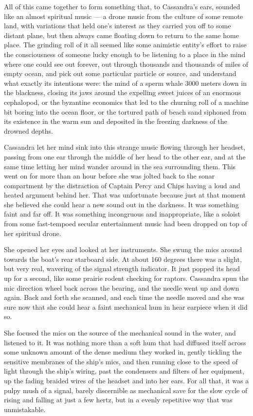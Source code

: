 \documentclass[]{scrbook}
\begin{document}
All of this came together to form something that, to Cassandra's ears,
sounded like an almost spiritual music --- a drone music from the
culture of some remote land, with variations that held one's interest as
they carried you off to some distant plane, but then always came
floating down to return to the same home place. The grinding roll of it
all seemed like some animistic entity's effort to raise the
consciousness of someone lucky enough to be listening to a place in the
mind where one could see out forever, out through thousands and
thousands of miles of empty ocean, and pick out some particular particle
or source, and understand what exactly its intentions were: the mind of
a sperm whale 3000 meters down in the blackness, closing its jaws around
the expelling sweet juices of an enormous cephalopod, or the byzantine
economics that led to the churning roll of a machine bit boring into the
ocean floor, or the tortured path of beach sand siphoned from its
existence in the warm sun and deposited in the freezing darkness of the
drowned depths.

Cassandra let her mind sink into this strange music flowing through her
headset, passing from one ear through the middle of her head to the
other ear, and at the same time letting her mind wander around in the
sea surrounding them. This went on for more than an hour before she was
jolted back to the sonar compartment by the distraction of Captain Percy
and Chips having a loud and heated argument behind her. That was
unfortunate because just at that moment she believed she could hear a
new sound out in the darkness. It was something faint and far off. It
was something incongruous and inappropriate, like a soloist from some
fast-tempoed secular entertainment music had been dropped on top of her
spiritual drone.

She opened her eyes and looked at her instruments. She swung the mics
around towards the boat's rear starboard side. At about 160 degrees
there was a slight, but very real, wavering of the signal strength
indicator. It just popped its head up for a second, like some prairie
rodent checking for raptors. Cassandra spun the mic direction wheel back
across the bearing, and the needle went up and down again. Back and
forth she scanned, and each time the needle moved and she was sure now
that she could hear a faint mechanical hum in hear earpiece when it did
so.

She focused the mics on the source of the mechanical sound in the water,
and listened to it. It was nothing more than a soft hum that had
diffused itself across some unknown amount of the dense medium they
worked in, gently tickling the sensitive membranes of the ship's mics,
and then running close to the speed of light through the ship's wiring,
past the condensers and filters of her equipment, up the fading braided
wires of the headset and into her ears. For all that, it was a pulpy
mush of a signal, barely discernible as mechanical save for the slow
cycle of rising and falling at just a few hertz, but in a evenly
repetitive way that was unmistakable.
\end{document}
